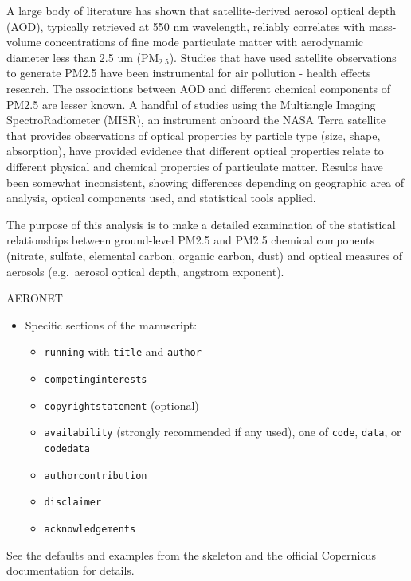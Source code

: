 \documentclass[, manuscript]{copernicus}
\begin{document}
A large body of literature has shown that satellite-derived aerosol
optical depth (AOD), typically retrieved at 550 nm wavelength, reliably
correlates with mass-volume concentrations of fine mode particulate
matter with aerodynamic diameter less than 2.5 um (PM\(_{2.5}\)).
Studies that have used satellite observations to generate PM2.5 have
been instrumental for air pollution - health effects research. The
associations between AOD and different chemical components of PM2.5 are
lesser known. A handful of studies using the Multiangle Imaging
SpectroRadiometer (MISR), an instrument onboard the NASA Terra satellite
that provides observations of optical properties by particle type (size,
shape, absorption), have provided evidence that different optical
properties relate to different physical and chemical properties of
particulate matter. Results have been somewhat inconsistent, showing
differences depending on geographic area of analysis, optical components
used, and statistical tools applied.

The purpose of this analysis is to make a detailed examination of the
statistical relationships between ground-level PM2.5 and PM2.5 chemical
components (nitrate, sulfate, elemental carbon, organic carbon, dust)
and optical measures of aerosols (e.g.~aerosol optical depth, angstrom
exponent).

AERONET \cite{Holben1998, Shin2018, Shin2018b, Shin2019}

\begin{itemize}
\item
  Specific sections of the manuscript:

  \begin{itemize}
  \item
    \texttt{running} with \texttt{title} and \texttt{author}
  \item
    \texttt{competinginterests}
  \item
    \texttt{copyrightstatement} (optional)
  \item
    \texttt{availability} (strongly recommended if any used), one of
    \texttt{code}, \texttt{data}, or \texttt{codedata}
  \item
    \texttt{authorcontribution}
  \item
    \texttt{disclaimer}
  \item
    \texttt{acknowledgements}
  \end{itemize}
\end{itemize}

See the defaults and examples from the skeleton and the official
Copernicus documentation for details.
\end{document}
